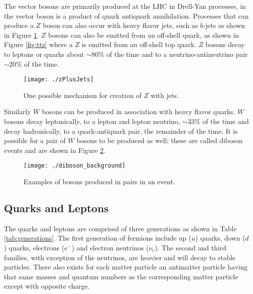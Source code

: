 	The vector bosons are primarily produced at the LHC in Drell-Yan processes, in the vector boson is a product of quark antiquark annihilation.  Processes that can produce a $Z$ boson can also occur with heavy flavor jets, such as $b$-jets as shown in Figure \ref{fig:zplusjets}.  $Z$ bosons can also be emitted from an off-shell quark, as shown in Figure \ref{fig:ttz} where a $Z$ is emitted from an off-shell top quark.  $Z$ bosons decay to leptons or quarks about $\sim$80\% of the time and to a neutrino-antineutrino pair $\sim$20\% of the time\cite{pdg}.  \\%
	
\begin{figure}[h!]
  \centering
	\texttt{[image: ./zPlusJets]}
\caption{\label{fig:zplusjets}{ One possible mechanism for creation of $Z$ with jets. }} 
\end{figure}	
	
	Similarly $W$ bosons can be produced in association with heavy flavor quarks.  $W$ bosons decay leptonically, to a lepton and lepton neutrino, $\sim$33\% of the time and decay hadronically, to a quark-antiquark pair, the remainder of the time.  It is possible for a pair of $W$ bosons to be produced as well; these are called diboson events and are shown in Figure \ref{fig:diboson}. \\
	
\begin{figure}[h!]
  \centering
	\texttt{[image: ./diboson\_background]}
\caption{\label{fig:diboson}{ Examples of bosons produced in pairs in an event. }} 
\end{figure}	
	


\subsection{Quarks and Leptons}

The quarks and leptons are comprised of three generations as shown in Table \ref{tab:generations}.  The first generation of fermions include up ($u$) quarks, down ($d$) quarks, electrons ($e^{-}$) and electron neutrinos ($\nu_{e}$).  The second and third families, with exception of the neutrinos, are heavier and will decay to stable particles.  There also exists for each matter particle an antimatter particle having that same masses and quantum numbers as the corresponding matter particle except with opposite charge.  \\

